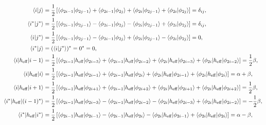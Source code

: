 \documentclass[a4paper]{book}
\newcounter{solution}[chapter]
\newcommand{\heff}{h_{\rm eff}}
\begin{document}
	\begin{solution}
	
	\begin{align*}
		\langle i | j \rangle &= \frac{1}{2} \left[ \langle \phi_{2i-1} | \phi_{2j-1} \rangle + \langle \phi_{2i-1} | \phi_{2j} \rangle + \langle \phi_{2i} | \phi_{2j-1} \rangle + \langle \phi_{2i} | \phi_{2j} \rangle \right] = \delta_{ij}, \\
		\langle i^* | j^* \rangle &= \frac{1}{2} \left[ \langle \phi_{2i-1} | \phi_{2j-1} \rangle - \langle \phi_{2i-1} | \phi_{2j} \rangle - \langle \phi_{2i} | \phi_{2j-1} \rangle + \langle \phi_{2i} | \phi_{2j} \rangle \right] = \delta_{ij}, \\
		\langle i | j^* \rangle &= \frac{1}{2} \left[ \langle \phi_{2i-1} | \phi_{2j-1} \rangle - \langle \phi_{2i-1} | \phi_{2j} \rangle + \langle \phi_{2i} | \phi_{2j-1} \rangle - \langle \phi_{2i} | \phi_{2j} \rangle \right] = 0, \\
		\langle i^* | j \rangle &= ( \langle i | j^* \rangle )^* = 0^* = 0 , \\
		\langle i | \heff | i-1 \rangle &= \frac{1}{2} \left[ \langle \phi_{2i-1} | \heff | \phi_{2i-3} \rangle + \langle \phi_{2i-1} | \heff | \phi_{2i-2} \rangle + \langle \phi_{2i} | \heff | \phi_{2i-3} \rangle + \langle \phi_{2i} | \heff | \phi_{2i-2} \rangle \right] = \frac{1}{2} \beta , \\
		\langle i | \heff | i \rangle &= \frac{1}{2} \left[ \langle \phi_{2i-1} | \heff | \phi_{2i-1} \rangle + \langle \phi_{2i-1} | \heff | \phi_{2i} \rangle + \langle \phi_{2i} | \heff | \phi_{2i-1} \rangle + \langle \phi_{2i} | \heff | \phi_{2i} \rangle \right] = \alpha + \beta , \\
		\langle i | \heff | i+1 \rangle &= \frac{1}{2} \left[ \langle \phi_{2i-1} | \heff | \phi_{2i+1} \rangle + \langle \phi_{2i-1} | \heff | \phi_{2i+2} \rangle + \langle \phi_{2i} | \heff | \phi_{2i+1} \rangle + \langle \phi_{2i} | \heff | \phi_{2i+2} \rangle \right] = \frac{1}{2} \beta , \\
		\langle i^* | \heff | (i-1)^* \rangle &= \frac{1}{2} \left[ \langle \phi_{2i-1} | \heff | \phi_{2i-3} \rangle - \langle \phi_{2i-1} | \heff | \phi_{2i-2} \rangle - \langle \phi_{2i} | \heff | \phi_{2i-3} \rangle + \langle \phi_{2i} | \heff | \phi_{2i-2} \rangle \right] = -\frac{1}{2} \beta , \\
		\langle i^* | \heff | i^* \rangle &= \frac{1}{2} \left[ \langle \phi_{2i-1} | \heff | \phi_{2i-1} \rangle - \langle \phi_{2i-1} | \heff | \phi_{2i} \rangle - \langle \phi_{2i} | \heff | \phi_{2i-1} \rangle + \langle \phi_{2i} | \heff | \phi_{2i} \rangle \right] = \alpha - \beta , \\

\end{align*}
\end{solution}
\end{document}
